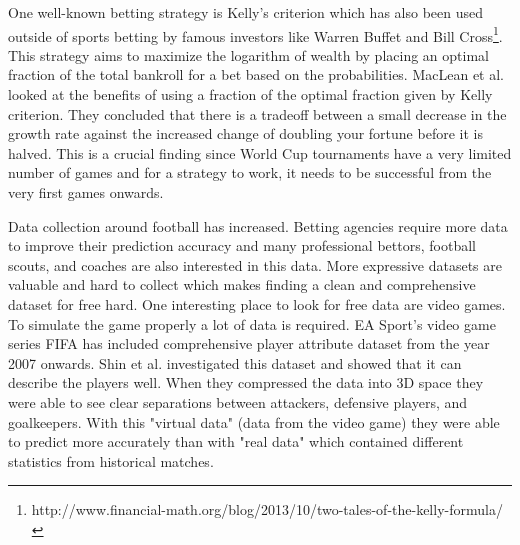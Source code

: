 One well-known betting strategy is Kelly's criterion which has also been used outside of sports betting by famous investors like Warren Buffet and Bill Cross\footnote{http://www.financial-math.org/blog/2013/10/two-tales-of-the-kelly-formula/}. This strategy aims to maximize the logarithm of wealth by placing an optimal fraction of the total bankroll for a bet based on the probabilities. MacLean et al.\cite{maclean1992growth} looked at the benefits of using a fraction of the optimal fraction given by Kelly criterion. They concluded that there is a tradeoff between a small decrease in the growth rate against the increased change of doubling your fortune before it is halved. This is a crucial finding since World Cup tournaments have a very limited number of games and for a strategy to work, it needs to be successful from the very first games onwards.

Data collection around football has increased. Betting agencies require more data to improve their prediction accuracy and many professional bettors, football scouts, and coaches are also interested in this data. More expressive datasets are valuable and hard to collect which makes finding a clean and comprehensive dataset for free hard. One interesting place to look for free data are video games. To simulate the game properly a lot of data is required. EA Sport's video game series FIFA has included comprehensive player attribute dataset from the year 2007 onwards. Shin et al. \cite{shin2014novel} investigated this dataset and showed that it can describe the players well. When they compressed the data into 3D space they were able to see clear separations between attackers, defensive players, and goalkeepers. With this "virtual data" (data from the video game) they were able to predict more accurately than with "real data" which contained different statistics from historical matches.

